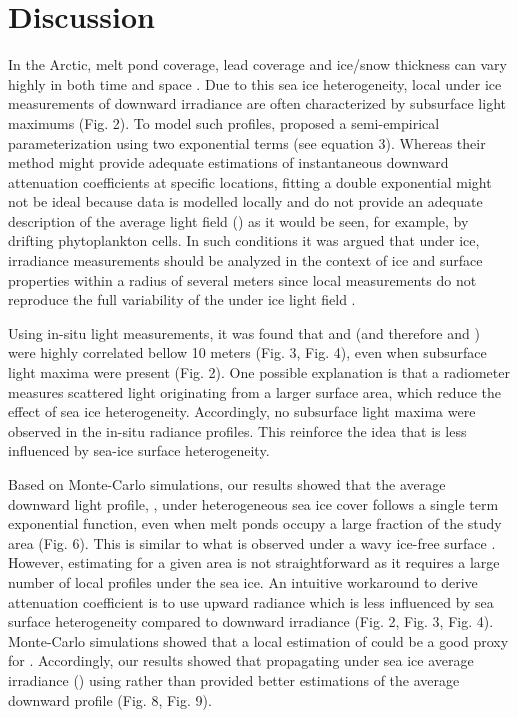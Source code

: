 \section{Discussion}

In the Arctic, melt pond coverage, lead coverage and ice/snow thickness can vary highly in both time and space \citep{Landy2014, Eicken2004}. Due to this sea ice heterogeneity, local under ice measurements of downward irradiance are often characterized by subsurface light maximums (Fig. 2). To model such profiles, \citet{Laney2017} proposed a semi-empirical parameterization using two exponential terms (see equation 3). Whereas their method might provide adequate estimations of instantaneous downward attenuation coefficients at specific locations, fitting a double exponential might not be ideal because data is modelled locally and do not provide an adequate description of the average light field (\meanedz{}) as it would be seen, for example, by drifting phytoplankton cells. In such conditions it was argued that under ice, irradiance measurements should be analyzed in the context of ice and surface properties within a radius of several meters since local measurements do not reproduce the full variability of the under ice light field \citep{Katlein2015}.

Using in-situ light measurements, it was found that \ed{} and \lu{} (and therefore \ked{} and \klu{}) were highly correlated bellow 10 meters (Fig. 3, Fig. 4), even when subsurface light maxima were present (Fig. 2). One possible explanation is that a \lu{} radiometer measures scattered light originating from a larger surface area, which reduce the effect of sea ice heterogeneity. Accordingly, no subsurface light maxima were observed in the in-situ radiance profiles. This reinforce the idea that \lu{} is less influenced by sea-ice surface heterogeneity. 

Based on Monte-Carlo simulations, our results showed that the average downward light profile, \meanedz, under heterogeneous sea ice cover follows a single term exponential function, even when melt ponds occupy a large fraction of the study area (Fig. 6). This is similar to what is observed under a wavy ice-free surface \citep{Zaneveld2001}. However, estimating \edz{} for a given area is not straightforward as it requires a large number of local profiles under the sea ice. An intuitive workaround to derive attenuation coefficient is to use upward radiance which is less influenced by sea surface heterogeneity compared to downward irradiance (Fig. 2, Fig. 3, Fig. 4). Monte-Carlo simulations showed that a local estimation of \klu{} could be a good proxy for \meanked{}. Accordingly, our results showed that propagating under sea ice average irradiance (\edzero{}) using \klu{} rather than \ked{} provided better estimations of the average downward profile (Fig. 8, Fig. 9).

